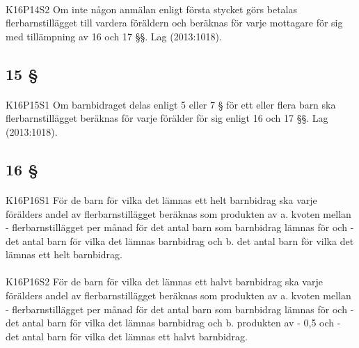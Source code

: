 \documentclass[a4paper,notitlepage,openany,10pt]{book}
\begin{document}
\paragraph*{}
{\tiny K16P14S2}
Om inte någon anmälan enligt första stycket görs betalas flerbarnstillägget till vardera föräldern och beräknas för varje mottagare för sig med tillämpning av 16 och 17 §§.
Lag (2013:1018).
\subsection*{15 §}
\paragraph*{}
{\tiny K16P15S1}
Om barnbidraget delas enligt 5 eller 7 § för ett eller flera barn ska flerbarnstillägget beräknas för varje förälder för sig enligt 16 och 17 §§.
Lag (2013:1018).
\subsection*{16 §}
\paragraph*{}
{\tiny K16P16S1}
För de barn för vilka det lämnas ett helt barnbidrag ska varje förälders andel av flerbarnstillägget beräknas som produkten av
\newline a. kvoten mellan
\newline - flerbarnstillägget per månad för det antal barn som barnbidrag lämnas för och
\newline - det antal barn för vilka det lämnas barnbidrag och
\newline b. det antal barn för vilka det lämnas ett helt barnbidrag.
\paragraph*{}
{\tiny K16P16S2}
För de barn för vilka det lämnas ett halvt barnbidrag ska varje förälders andel av flerbarnstillägget beräknas som produkten av
\newline a. kvoten mellan
\newline - flerbarnstillägget per månad för det antal barn som barnbidrag lämnas för och
\newline - det antal barn för vilka det lämnas barnbidrag och
\newline b. produkten av
\newline - 0,5 och
\newline - det antal barn för vilka det lämnas ett halvt barnbidrag.
\end{document}

